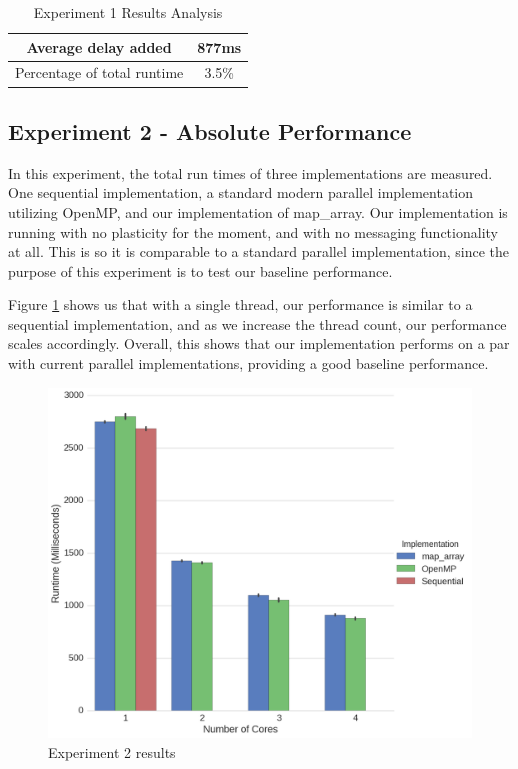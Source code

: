 \begin{table}[H]
\centering
	\begin{tabular}{|c|c|}
		\hline
		Average delay added & 877ms \\
		\hline
		Percentage of total runtime & 3.5\% \\
		\hline
	\end{tabular}
	\caption{Experiment 1 Results Analysis}
	\label{table:results_experiment_1_results_analysis}
\end{table}





\subsection{Experiment 2 - Absolute Performance}

In this experiment, the total run times of three implementations are measured. One sequential implementation, a standard modern parallel implementation utilizing OpenMP, and our implementation of map\_array. Our implementation is running with no plasticity for the moment, and with no messaging functionality at all. This is so it is comparable to a standard parallel implementation, since the purpose of this experiment is to test our baseline performance.

Figure \ref{fig:results_ex2} shows us that with a single thread, our performance is similar to a sequential implementation, and as we increase the thread count, our performance scales accordingly. Overall, this shows that our implementation performs on a par with current parallel implementations, providing a good baseline performance. 



\begin{figure}
	\centering
	\includegraphics[width=\textwidth]{graphics/experiment2.png}
	\caption{Experiment 2 results}
	\label{fig:results_ex2}
\end{figure}

